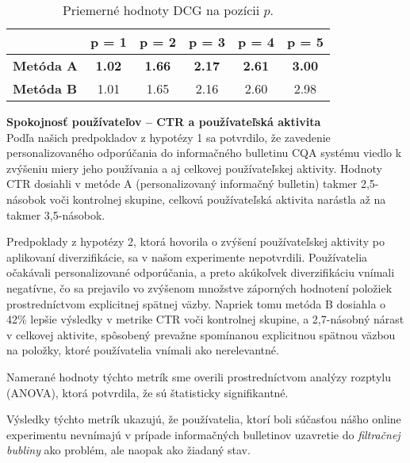 \begin{table}[H]
\centering
\caption{Priemerné hodnoty DCG na pozícii $p$.}
\label{tab:dcgn}
\begin{tabular}{|l|c|c|c|c|c|}
\hline
                  & \textbf{p = 1} & \textbf{p = 2} & \textbf{p = 3} & \textbf{p = 4} & \textbf{p = 5} \\ \hline
\textbf{Metóda A} & \textbf{1.02}  & \textbf{1.66}  & \textbf{2.17}  & \textbf{2.61}  & \textbf{3.00}  \\ \hline
\textbf{Metóda B} & 1.01           & 1.65           & 2.16           & 2.60           & 2.98           \\ \hline
\end{tabular}
\end{table}


\textbf{Spokojnosť používateľov -- CTR a používateľská aktivita}\\
Podľa našich predpokladov z hypotézy 1 sa potvrdilo, že zavedenie personalizovaného odporúčania do informačného bulletinu
CQA systému viedlo k zvýšeniu miery jeho používania a aj celkovej používateľskej aktivity. Hodnoty CTR dosiahli v metóde A
(personalizovaný informačný bulletin) takmer 2,5-násobok voči kontrolnej skupine, celková používateľská aktivita narástla
až na takmer 3,5-násobok.

Predpoklady z hypotézy 2, ktorá hovorila o zvýšení používateľskej aktivity po aplikovaní diverzifikácie, sa v našom
experimente nepotvrdili. Používatelia očakávali personalizované odporúčania, a preto akúkoľvek diverzifikáciu vnímali negatívne,
čo sa prejavilo vo zvýšenom množstve záporných hodnotení položiek prostredníctvom explicitnej spätnej väzby.
Napriek tomu metóda B dosiahla o 42\% lepšie výsledky v metrike CTR voči kontrolnej skupine, a 2,7-násobný nárast v celkovej
aktivite, spôsobený prevažne spomínanou explicitnou spätnou väzbou na položky, ktoré používatelia vnímali ako nerelevantné.

Namerané hodnoty týchto metrík sme overili prostredníctvom analýzy rozptylu (ANOVA), ktorá potvrdila, že sú štatisticky
signifikantné.

Výsledky týchto metrík ukazujú, že používatelia, ktorí boli súčasťou nášho online experimentu nevnímajú v prípade
informačných bulletinov uzavretie do \textit{filtračnej bubliny} ako problém, ale naopak ako žiadaný stav.

